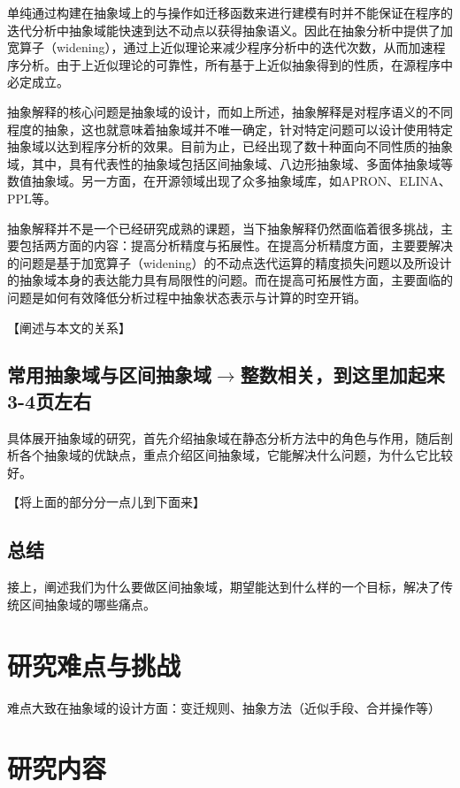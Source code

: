  单纯通过构建在抽象域上的与操作如迁移函数来进行建模有时并不能保证在程序的迭代分析中抽象域能快速到达不动点以获得抽象语义。因此在抽象分析中提供了加宽算子（widening），通过上近似理论来减少程序分析中的迭代次数，从而加速程序分析。由于上近似理论的可靠性，所有基于上近似抽象得到的性质，在源程序中必定成立。
 
 抽象解释的核心问题是抽象域的设计，而如上所述，抽象解释是对程序语义的不同程度的抽象，这也就意味着抽象域并不唯一确定，针对特定问题可以设计使用特定抽象域以达到程序分析的效果。目前为止，已经出现了数十种面向不同性质的抽象域，其中，具有代表性的抽象域包括区间抽象域、八边形抽象域、多面体抽象域等数值抽象域\cite{张健2019程序分析研究进展}。另一方面，在开源领域出现了众多抽象域库，如APRON\cite{jeannet2009apron}、ELINA\cite{singh2017practical}、PPL\cite{bagnara2006parma}等。
 
 抽象解释并不是一个已经研究成熟的课题，当下抽象解释仍然面临着很多挑战，主要包括两方面的内容：提高分析精度与拓展性。在提高分析精度方面，主要要解决的问题是基于加宽算子（widening）的不动点迭代运算的精度损失问题以及所设计的抽象域本身的表达能力具有局限性的问题。而在提高可拓展性方面，主要面临的问题是如何有效降低分析过程中抽象状态表示与计算的时空开销。
 
 【阐述与本文的关系】
 
 \subsection{常用抽象域与区间抽象域$\rightarrow$整数相关，到这里加起来3-4页左右}
 
 具体展开抽象域的研究，首先介绍抽象域在静态分析方法中的角色与作用，随后剖析各个抽象域的优缺点，重点介绍区间抽象域，它能解决什么问题，为什么它比较好。
 
 【将上面的部分分一点儿到下面来】
 
 \subsection{总结}
 
 接上，阐述我们为什么要做区间抽象域，期望能达到什么样的一个目标，解决了传统区间抽象域的哪些痛点。
 
 \section{研究难点与挑战}
 
 难点大致在抽象域的设计方面：变迁规则、抽象方法（近似手段、合并操作等）
 
 \section{研究内容}
 
